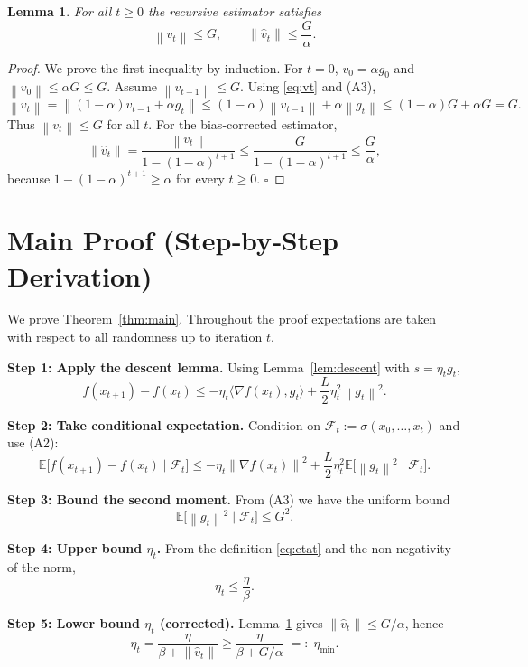 \documentclass{article}
\newtheorem{lemma}{Lemma}
\newcommand{\EE}{\mathbb{E}}
\newcommand{\norm}[1]{\left\lVert#1\right\rVert}
\begin{document}
\begin{lemma}\label{lem:vtbound}
For all $t\ge0$ the recursive estimator satisfies
\[
\norm{v_t}\le G,\qquad
\norm{\hat v_t}\le \frac{G}{\alpha}.
\]
\end{lemma}
\begin{proof}
We prove the first inequality by induction.
For $t=0$, $v_0=\alpha g_0$ and $\norm{v_0}\le\alpha G\le G$.
Assume $\norm{v_{t-1}}\le G$. Using \eqref{eq:vt} and (A3),
\[
\norm{v_t}
 =\norm{(1-\alpha)v_{t-1}+\alpha g_t}
 \le (1-\alpha)\norm{v_{t-1}}+\alpha\norm{g_t}
 \le (1-\alpha)G+\alpha G = G .
\]
Thus $\norm{v_t}\le G$ for all $t$.
For the bias‑corrected estimator,
\[
\norm{\hat v_t}
 =\frac{\norm{v_t}}{1-(1-\alpha)^{t+1}}
 \le \frac{G}{1-(1-\alpha)^{t+1}}
 \le \frac{G}{\alpha},
\]
because $1-(1-\alpha)^{t+1}\ge\alpha$ for every $t\ge0$.
\hfill $\square$
\end{proof}

\section*{Main Proof (Step‑by‑Step Derivation)}
We prove Theorem~\ref{thm:main}. Throughout the proof expectations are taken
with respect to all randomness up to iteration $t$.

\medskip
\noindent\textbf{Step 1: Apply the descent lemma.}  
Using Lemma~\ref{lem:descent} with $s=\eta_t g_t$,
\[
f(x_{t+1})-f(x_t)
\le -\eta_t\langle\nabla f(x_t),g_t\rangle
+\frac{L}{2}\eta_t^{2}\norm{g_t}^{2}.
\tag{1}
\]

\noindent\textbf{Step 2: Take conditional expectation.}  
Condition on $\mathcal{F}_t:=\sigma(x_0,\dots,x_t)$ and use (A2):
\[
\EE\!\bigl[f(x_{t+1})-f(x_t)\mid\mathcal{F}_t\bigr]
\le -\eta_t\norm{\nabla f(x_t)}^{2}
+\frac{L}{2}\eta_t^{2}\EE\!\bigl[\norm{g_t}^{2}\mid\mathcal{F}_t\bigr].
\tag{2}
\]

\noindent\textbf{Step 3: Bound the second moment.}  
From (A3) we have the uniform bound
\[
\EE\!\bigl[\norm{g_t}^{2}\mid\mathcal{F}_t\bigr]\le G^{2}.
\tag{3}
\]

\noindent\textbf{Step 4: Upper bound $\eta_t$.}  
From the definition \eqref{eq:etat} and the non‑negativity of the norm,
\[
\eta_t\le\frac{\eta}{\beta}.
\tag{4}
\]

\noindent\textbf{Step 5: Lower bound $\eta_t$ (corrected).}  
Lemma~\ref{lem:vtbound} gives $\norm{\hat v_t}\le G/\alpha$, hence
\[
\eta_t
 =\frac{\eta}{\beta+\norm{\hat v_t}}
 \ge \frac{\eta}{\beta+G/\alpha}
 \;=: \;\eta_{\min}.
\tag{5}
\]
\end{document}
